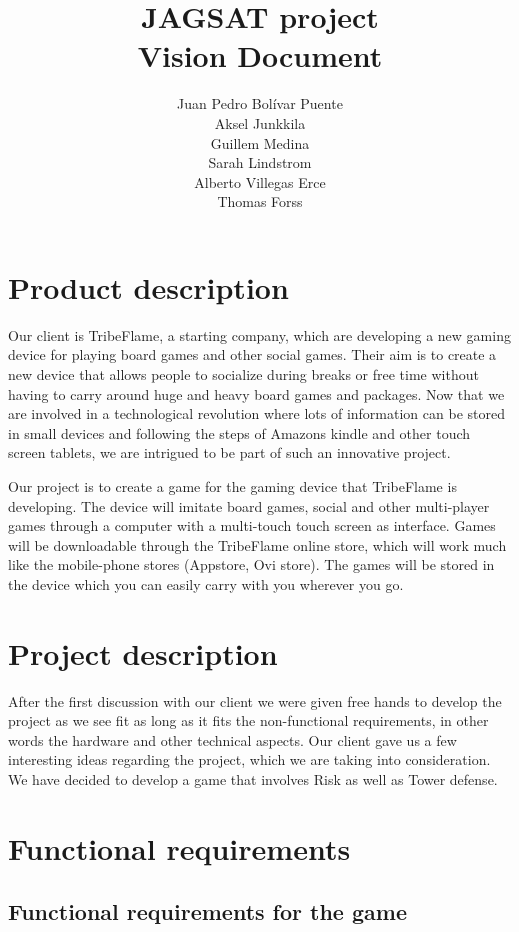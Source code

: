 \documentclass[12pt,a4paper]{article}
\title{\large JAGSAT project\\\huge Vision Document}
\author{
  Juan Pedro Bolívar Puente\\ 
  Aksel Junkkila\\
  Guillem Medina\\ 
  Sarah Lindstrom\\ 
  Alberto Villegas Erce\\ 
  Thomas Forss
}
\begin{document}
\maketitle

\tableofcontents
\pagebreak

\disabletodo

\section{Product description}

Our client is TribeFlame, a starting company, which are developing a
new gaming device for playing board games and other social
games. Their aim is to create a new device that allows people to
socialize during breaks or free time without having to carry around
huge and heavy board games and packages. Now that we are involved in a
technological revolution where lots of information can be stored in
small devices and following the steps of Amazons kindle and other
touch screen tablets, we are intrigued to be part of such an
innovative project.

Our project is to create a game for the gaming device that TribeFlame
is developing. The device will imitate board games, social and other
multi-player games through a computer with a multi-touch touch screen
as interface. Games will be downloadable through the TribeFlame online
store, which will work much like the mobile-phone stores (Appstore,
Ovi store). The games will be stored in the device which you can
easily carry with you wherever you go.

\section{Project description}

After the first discussion with our client we were given free hands to
develop the project as we see fit as long as it fits the
non-functional requirements, in other words the hardware and other
technical aspects. Our client gave us a few interesting ideas
regarding the project, which we are taking into consideration. We have
decided to develop a game that involves Risk as well as Tower defense.

\section{Functional requirements}

\subsection{Functional requirements for the game}
\end{document}

